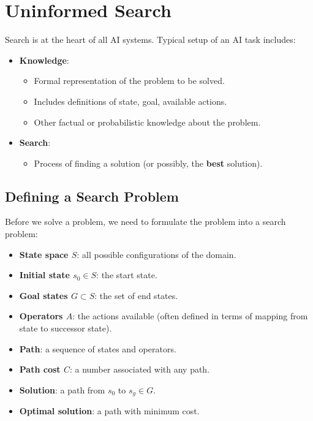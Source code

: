 \documentclass[10pt, a4paper, oneside]{book}
\theoremstyle{theoremdd}
\theoremstyle{remark}
\begin{document}
\section{Uninformed Search}
Search is at the heart of all AI systems. Typical setup of an AI task includes:
\begin{itemize}
\item \textbf{Knowledge}: 
\begin{itemize}
\item Formal representation of the problem to be solved.
\item Includes definitions of state, goal, available actions.
\item Other factual or probabilistic knowledge about the problem.
\end{itemize}
\end{itemize}
\begin{itemize}
\item \textbf{Search}:
\begin{itemize}
\item Process of finding a solution (or possibly, the \textbf{best} solution).
\end{itemize}
\end{itemize}

\subsection{Defining a Search Problem}
Before we solve a problem, we need to formulate the problem into a search problem:
\begin{itemize}
\item \textbf{State space $S$}: all possible configurations of the domain.
\item \textbf{Initial state $s_{0} \in S$}: the start state. 
\item \textbf{Goal states $G \subset S$}: the set of end states.
\item \textbf{Operators $A$}: the actions available (often defined in terms of mapping from state to successor state).
\item \textbf{Path}: a sequence of states and operators.
\item \textbf{Path cost $C$}: a number associated with any path.
\item \textbf{Solution}: a path from $s_{0}$ to $s_{g} \in G$.
\item \textbf{Optimal solution}: a path with minimum cost.
\end{itemize}
\end{document}
